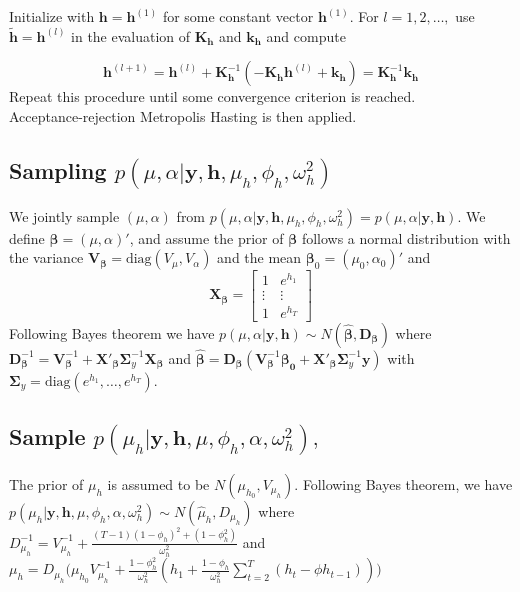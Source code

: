 \documentclass[11pt]{article}
\newcommand{\beq}{\begin{equation}}
\newcommand{\eeq}{\end{equation}}
\newcommand{\bbeq}{\begin{equation*}}
\newcommand{\eeeq}{\end{equation*}}
\newcommand{\bbmatrix}{\begin{bmatrix}}
\newcommand{\ebmatrix}{\end{bmatrix}}
\numberwithin{equation}{section}
\begin{document}
 Initialize with $\mathbf{h}=\mathbf{h}^{(1)}$ for some constant vector $\mathbf{h}^{(1)}$. For $l =1, 2, \ldots,$ use $\mathbf{\tilde{h}}=\mathbf{h}^{(l)}$ in the evaluation of $\mathbf{K_h}$ and $\mathbf{k_h}$ and compute
 
 \beq
 \mathbf{h}^{(l+1)}=\mathbf{h}^{(l)} + \mathbf{K}^{-1}_{\mathbf{h}}(-\mathbf{K}_{\mathbf{h}} \mathbf{h}^{(l)} +\mathbf{k}_{\mathbf{h}})= \mathbf{K}^{-1}_{\mathbf{h}}\mathbf{k}_{\mathbf{h}}
 \eeq
 Repeat this procedure until some convergence criterion is reached.\\
 
 Acceptance-rejection Metropolis Hasting is then applied. 
\subsection*{Sampling $p(\mu, \alpha |\mathbf{y}, \mathbf{h}, \mu_h, \phi_h, \omega^2_h)$}
We jointly sample $(\mu, \alpha)$ from $p(\mu, \alpha |\mathbf{y}, \mathbf{h}, \mu_h, \phi_h, \omega^2_h)= p(\mu, \alpha|\mathbf{y}, \mathbf{h})$. We define $\bm{\beta}=(\mu, \alpha)'$, and assume the prior of $\bm{\beta}$ follows a normal distribution with the variance  $\mathbf{V_{\beta}}=\text{diag}(V_{\mu}, V_{\alpha})$ and the mean $\bm{\beta}_0=(\mu_0, \alpha_0)'$ and 
\bbeq
\mathbf{X}_{\bm{\beta}}
=\bbmatrix 1 & e^{h_1}\\
\vdots & \vdots \\
1 & e^{h_T}
\ebmatrix
\eeeq
Following Bayes theorem we have $p(\mu, \alpha| \mathbf{y}, \mathbf{h}) \sim  N(\hat{\bm{\beta}}, \mathbf{D}_{\bm{\beta}}) $ where   $\mathbf{D}_{\bm{\beta}}^{-1} = \mathbf{V}^{-1}_{\bm{\beta}}+ \mathbf{X}'_{\bm{\beta}} \mathbf{\Sigma}^{-1}_y\mathbf{X}_{\bm{\beta}}$ and $\hat{\bm{\beta}}=\mathbf{D}_{\bm{\beta}}(\mathbf{V}_{\bm{\beta}}^{-1} \bm{\beta_0} +\mathbf{X}'_{\bm{\beta}}  \mathbf{\Sigma}^{-1}_y \mathbf{y})$ with  $\mathbf{\Sigma}_y=\text{diag}(e^{h_1}, \ldots, e^{h_T})$.
\subsection*{Sample $p(\mu_h|\mathbf{y}, \mathbf{h}, \mu, \phi_h, \alpha, \omega^2_h),$}
The prior of $\mu_h$ is assumed to be $N(\mu_{h_0}, V_{\mu_h})$. Following Bayes theorem, we have\\
 $p(\mu_h|\mathbf{y}, \mathbf{h}, \mu, \phi_h, \alpha, \omega^2_h) \sim N(\hat{\mu}_h, D_{\mu_h})$ where $D^{-1}_{\mu_h}=V^{-1}_{\mu_h} +\frac{(T-1)(1-\phi_h)^2+(1-\phi_h^2)}{\omega^2_h} $ and $\mu_h=D_{\mu_h} \Big (\mu_{h_0}V^{-1}_{\mu_h}+\frac{1-\phi^2_h}{\omega^2_h}(h_1+\frac{1-\phi_h}{\omega_h^2}\sum_{t=2}^T( h_t -\phi h_{t-1}))\Big)$
\end{document}
